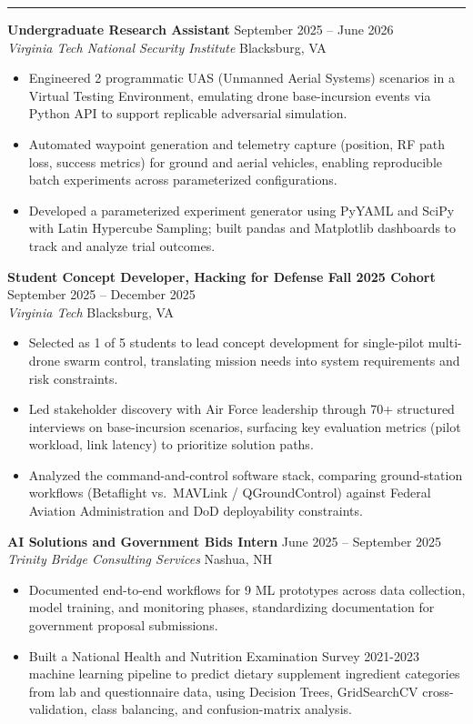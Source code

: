 \documentclass[letterpaper,10pt]{article}
\newcommand{\resumesection}[1]{%
    \vspace{6pt}
    \noindent{\large\bfseries #1}\par
    \vspace{2pt}
    \hrule
    \vspace{4pt}
}
\begin{document}
\resumesection{Experience}

\textbf{Undergraduate Research Assistant} \hfill September 2025 -- June 2026\\
\textit{Virginia Tech National Security Institute} \hfill Blacksburg, VA
\begin{itemize}
    \item Engineered 2 programmatic UAS (Unmanned Aerial Systems) scenarios in a Virtual Testing Environment, emulating drone base-incursion events via Python API to support replicable adversarial simulation.
    \item Automated waypoint generation and telemetry capture (position, RF path loss, success metrics) for ground and aerial vehicles, enabling reproducible batch experiments across parameterized configurations.
    \item Developed a parameterized experiment generator using PyYAML and SciPy with Latin Hypercube Sampling; built pandas and Matplotlib dashboards to track and analyze trial outcomes.
\end{itemize}

\vspace{4pt}

\textbf{Student Concept Developer, Hacking for Defense Fall 2025 Cohort} \hfill September 2025 -- December 2025\\
\textit{Virginia Tech} \hfill Blacksburg, VA
\begin{itemize}
    \item Selected as 1 of 5 students to lead concept development for single-pilot multi-drone swarm control, translating mission needs into system requirements and risk constraints.
    \item Led stakeholder discovery with Air Force leadership through 70+ structured interviews on base-incursion scenarios, surfacing key evaluation metrics (pilot workload, link latency) to prioritize solution paths.
    \item Analyzed the command-and-control software stack, comparing ground-station workflows (Betaflight vs.\ MAVLink / QGroundControl) against Federal Aviation Administration and DoD deployability constraints.
\end{itemize}

\vspace{4pt}

\textbf{AI Solutions and Government Bids Intern} \hfill June 2025 -- September 2025\\
\textit{Trinity Bridge Consulting Services} \hfill Nashua, NH
\begin{itemize}
    \item Documented end-to-end workflows for 9 ML prototypes across data collection, model training, and monitoring phases, standardizing documentation for government proposal submissions.
    \item Built a National Health and Nutrition Examination Survey 2021-2023 machine learning pipeline to predict dietary supplement ingredient categories from lab and questionnaire data, using Decision Trees, GridSearchCV cross-validation, class balancing, and confusion-matrix analysis.
\end{itemize}
\end{document}
